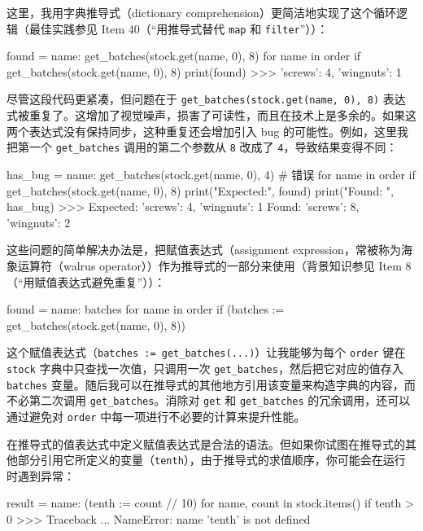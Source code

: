 这里，我用字典推导式（dictionary comprehension）更简洁地实现了这个循环逻辑（最佳实践参见 Item 40（``用推导式替代 \texttt{map} 和 \texttt{filter}''））：

\begin{codebox}[python]
found = {name: get_batches(stock.get(name, 0), 8)
         for name in order
         if get_batches(stock.get(name, 0), 8)}
print(found)
>>>
{'screws': 4, 'wingnuts': 1}
\end{codebox}

尽管这段代码更紧凑，但问题在于 \texttt{get\_batches(stock.get(name, 0), 8)} 表达式被重复了。这增加了视觉噪声，损害了可读性，而且在技术上是多余的。如果这两个表达式没有保持同步，这种重复还会增加引入 bug 的可能性。例如，这里我把第一个 \texttt{get\_batches} 调用的第二个参数从 \texttt{8} 改成了 \texttt{4}，导致结果变得不同：

\begin{codebox}[python]
has_bug = {name: get_batches(stock.get(name, 0), 4)  # 错误
           for name in order
           if get_batches(stock.get(name, 0), 8)}
print("Expected:", found)
print("Found:   ", has_bug)
>>>
Expected: {'screws': 4, 'wingnuts': 1}
Found:    {'screws': 8, 'wingnuts': 2}
\end{codebox}

这些问题的简单解决办法是，把赋值表达式（assignment expression，常被称为海象运算符（walrus operator））作为推导式的一部分来使用（背景知识参见 Item 8（``用赋值表达式避免重复''））：

\begin{codebox}[python]
found = {name: batches for name in order
         if (batches := get_batches(stock.get(name, 0), 8))}
\end{codebox}

这个赋值表达式（\texttt{batches := get\_batches(...)}）让我能够为每个 \texttt{order} 键在 \texttt{stock} 字典中只查找一次值，只调用一次 \texttt{get\_batches}，然后把它对应的值存入 \texttt{batches} 变量。随后我可以在推导式的其他地方引用该变量来构造字典的内容，而不必第二次调用 \texttt{get\_batches}。消除对 \texttt{get} 和 \texttt{get\_batches} 的冗余调用，还可以通过避免对 \texttt{order} 中每一项进行不必要的计算来提升性能。

在推导式的值表达式中定义赋值表达式是合法的语法。但如果你试图在推导式的其他部分引用它所定义的变量（\texttt{tenth}），由于推导式的求值顺序，你可能会在运行时遇到异常：

\begin{codebox}[python]
result = {name: (tenth := count // 10)
          for name, count in stock.items() if tenth > 0}
>>>
Traceback ...
NameError: name 'tenth' is not defined
\end{codebox}

